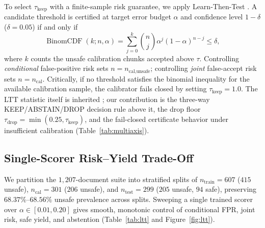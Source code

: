 \documentclass{article}
\begin{document}
To select $\tau_{\text{keep}}$ with a finite-sample risk guarantee, we apply Learn-Then-Test \citep{angelopoulos2021ltt}. A candidate threshold is certified at target error budget $\alpha$ and confidence level $1-\delta$ ($\delta=0.05$) if and only if
\begin{equation}
\operatorname{BinomCDF}(k; n, \alpha) = \sum_{j=0}^{k} \binom{n}{j} \alpha^j (1-\alpha)^{n-j} \le \delta,
\end{equation}
where $k$ counts the unsafe calibration chunks accepted above $\tau$. Controlling \emph{conditional} false-positive risk sets $n = n_{\text{cal,unsafe}}$; controlling \emph{joint} false-accept risk sets $n = n_{\text{cal}}$. Critically, if no threshold satisfies the binomial inequality for the available calibration sample, the calibrator fails closed by setting $\tau_{\text{keep}} = 1.0$. The LTT statistic itself is inherited \citep{angelopoulos2021ltt}; our contribution is the three-way KEEP/ABSTAIN/DROP decision rule above it, the drop floor $\tau_{\text{drop}} = \min(0.25, \tau_{\text{keep}})$, and the fail-closed certificate behavior under insufficient calibration (Table~\ref{tab:multiaxis}).

\subsection{Single-Scorer Risk--Yield Trade-Off}
We partition the $1{,}207$-document suite into stratified splits of $n_{\text{train}}=607$ ($415$ unsafe), $n_{\text{cal}}=301$ ($206$ unsafe), and $n_{\text{test}}=299$ ($205$ unsafe, $94$ safe), preserving $68.37\%$--$68.56\%$ unsafe prevalence across splits. Sweeping a single trained scorer over $\alpha \in [0.01, 0.20]$ gives smooth, monotonic control of conditional FPR, joint risk, safe yield, and abstention (Table~\ref{tab:ltt} and Figure~\ref{fig:ltt}).
\end{document}
